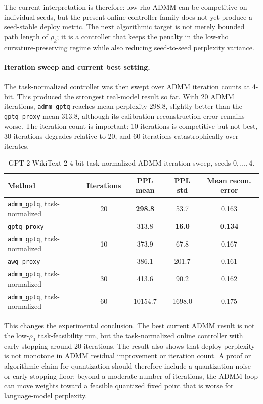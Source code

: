 \documentclass[11pt]{article}
\begin{document}
The current interpretation is therefore: low-rho ADMM can be competitive on
individual seeds, but the present online controller family does not yet produce
a seed-stable deploy metric.  The next algorithmic target is not merely
bounded path length of \(\rho_k\); it is a controller that keeps the penalty in
the low-rho curvature-preserving regime while also reducing seed-to-seed
perplexity variance.

\paragraph{Iteration sweep and current best setting.}
The task-normalized controller was then swept over ADMM iteration counts at
4-bit.  This produced the strongest real-model result so far.  With 20 ADMM
iterations, \texttt{admm\_gptq} reaches mean perplexity \(298.8\), slightly
better than the \texttt{gptq\_proxy} mean \(313.8\), although its calibration
reconstruction error remains worse.  The iteration count is important:
10 iterations is competitive but not best, 30 iterations degrades relative to
20, and 60 iterations catastrophically over-iterates.

\begin{table}[h]
\centering
\caption{GPT-2 WikiText-2 4-bit task-normalized ADMM iteration sweep,
seeds \(0,\ldots,4\).}
\label{tab:gpt2-tasknorm-iter-sweep}
\begin{tabular}{lcccc}
\toprule
Method & Iterations & PPL mean & PPL std & Mean recon. error\\
\midrule
\texttt{admm\_gptq}, task-normalized & 20 & \textbf{298.8} & 53.7 & 0.163\\
\texttt{gptq\_proxy} & -- & 313.8 & \textbf{16.0} & \textbf{0.134}\\
\texttt{admm\_gptq}, task-normalized & 10 & 373.9 & 67.8 & 0.167\\
\texttt{awq\_proxy} & -- & 386.1 & 201.7 & 0.161\\
\texttt{admm\_gptq}, task-normalized & 30 & 413.6 & 90.2 & 0.162\\
\texttt{admm\_gptq}, task-normalized & 60 & 10154.7 & 1698.0 & 0.175\\
\bottomrule
\end{tabular}
\end{table}

This changes the experimental conclusion.  The best current ADMM result is not
the low-\(\rho_0\) task-feasibility run, but the task-normalized online
controller with early stopping around 20 iterations.  The result also shows
that deploy perplexity is not monotone in ADMM residual improvement or
iteration count.  A proof or algorithmic claim for quantization should
therefore include a quantization-noise or early-stopping floor: beyond a
moderate number of iterations, the ADMM loop can move weights toward a
feasible quantized fixed point that is worse for language-model perplexity.
\end{document}

